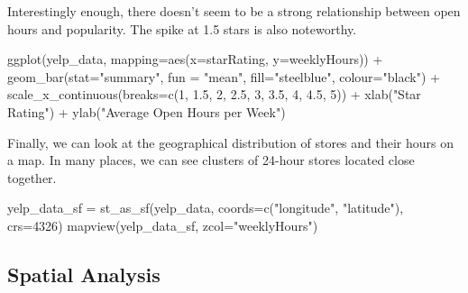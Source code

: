 \documentclass[
  12pt,
  letterpaper,
  DIV=11,
  numbers=noendperiod]{scrartcl}
\newenvironment{Shaded}{\begin{snugshade}}{\end{snugshade}}
\newcommand{\AttributeTok}[1]{\textcolor[rgb]{0.98,0.46,0.51}{#1}}
\newcommand{\DecValTok}[1]{\textcolor[rgb]{0.47,0.72,1.00}{#1}}
\newcommand{\FloatTok}[1]{\textcolor[rgb]{0.47,0.72,1.00}{#1}}
\newcommand{\FunctionTok}[1]{\textcolor[rgb]{0.70,0.57,0.94}{#1}}
\newcommand{\NormalTok}[1]{\textcolor[rgb]{0.88,0.89,0.91}{#1}}
\newcommand{\OtherTok}[1]{\textcolor[rgb]{0.70,0.57,0.94}{#1}}
\newcommand{\SpecialCharTok}[1]{\textcolor[rgb]{0.47,0.72,1.00}{#1}}
\newcommand{\StringTok}[1]{\textcolor[rgb]{0.62,0.80,1.00}{#1}}
\begin{document}
Interestingly enough, there doesn't seem to be a strong relationship
between open hours and popularity. The spike at 1.5 stars is also
noteworthy.

\begin{Shaded}
\begin{Highlighting}[]
\FunctionTok{ggplot}\NormalTok{(yelp\_data, }\AttributeTok{mapping=}\FunctionTok{aes}\NormalTok{(}\AttributeTok{x=}\NormalTok{starRating, }\AttributeTok{y=}\NormalTok{weeklyHours)) }\SpecialCharTok{+}
  \FunctionTok{geom\_bar}\NormalTok{(}\AttributeTok{stat=}\StringTok{"summary"}\NormalTok{, }\AttributeTok{fun =} \StringTok{"mean"}\NormalTok{, }\AttributeTok{fill=}\StringTok{"steelblue"}\NormalTok{, }\AttributeTok{colour=}\StringTok{"black"}\NormalTok{) }\SpecialCharTok{+}
  \FunctionTok{scale\_x\_continuous}\NormalTok{(}\AttributeTok{breaks=}\FunctionTok{c}\NormalTok{(}\DecValTok{1}\NormalTok{, }\FloatTok{1.5}\NormalTok{, }\DecValTok{2}\NormalTok{, }\FloatTok{2.5}\NormalTok{, }\DecValTok{3}\NormalTok{, }\FloatTok{3.5}\NormalTok{, }\DecValTok{4}\NormalTok{, }\FloatTok{4.5}\NormalTok{, }\DecValTok{5}\NormalTok{)) }\SpecialCharTok{+}
  \FunctionTok{xlab}\NormalTok{(}\StringTok{"Star Rating"}\NormalTok{) }\SpecialCharTok{+}
  \FunctionTok{ylab}\NormalTok{(}\StringTok{"Average Open Hours per Week"}\NormalTok{)}
\end{Highlighting}
\end{Shaded}

Finally, we can look at the geographical distribution of stores and
their hours on a map. In many places, we can see clusters of 24-hour
stores located close together.

\begin{Shaded}
\begin{Highlighting}[]
\NormalTok{yelp\_data\_sf }\OtherTok{=} \FunctionTok{st\_as\_sf}\NormalTok{(yelp\_data, }\AttributeTok{coords=}\FunctionTok{c}\NormalTok{(}\StringTok{"longitude"}\NormalTok{, }\StringTok{"latitude"}\NormalTok{), }\AttributeTok{crs=}\DecValTok{4326}\NormalTok{)}
\FunctionTok{mapview}\NormalTok{(yelp\_data\_sf, }\AttributeTok{zcol=}\StringTok{"weeklyHours"}\NormalTok{)}
\end{Highlighting}
\end{Shaded}

\newpage{}

\subsection{Spatial Analysis}\label{spatial-analysis-1}
\end{document}
